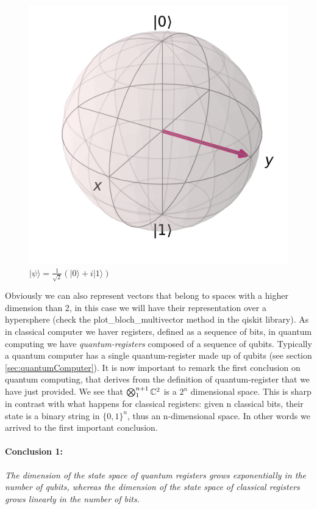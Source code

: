 \documentclass[english]{article}
\newcommand{\sbigotimes}{%
	\mathop{\mathchoice{\textstyle\bigotimes}{\bigotimes}{\bigotimes}{\bigotimes}}%
}
\begin{document}
\begin{enumerate}
\begin{figure}[h]
\begin{minipage}{0.4\textwidth}
							\includegraphics[scale=0.33]{yket.png}
							\caption{$|\psi\rangle = \frac{1}{\sqrt{2}}(|0\rangle+i|1\rangle)$}
						\end{minipage}
					\end{figure}
				\end{enumerate}
			
			Obviously we can also represent vectors that belong to spaces with a higher dimension than 2, in this case we will have their representation over a hypersphere (check the plot\_bloch\_multivector method in the qiskit library). As in classical computer we haver registers, defined as a sequence of bits, in quantum computing we have \emph{quantum-registers} composed of a sequence of qubits. Typically a quantum computer has a single quantum-register made up of qubits (see section \ref{sec:quantumComputer}). It is now important to remark the first conclusion on quantum computing, that derives from the definition of quantum-register that we have just provided. We see that $\sbigotimes_1^{n+1} \mathbb{C}^{2}$ is a $2^{n}$ dimensional space. This is sharp in contrast with what happens for classical registers: given n classical bits, their state is a binary string in $\{0,1\}^{n}$, thus an n-dimensional space. In other words we arrived to the first important conclusion.
			
			\paragraph{Conclusion 1:} \emph{The dimension of the state space of quantum registers grows exponentially in the number of qubits, whereas the dimension of the state space of classical registers grows linearly in the number of bits.}
			
\end{document}
